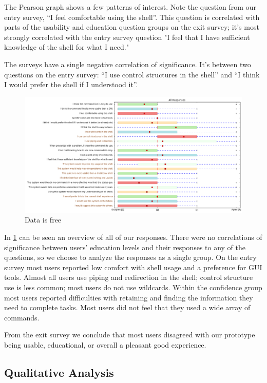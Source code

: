 The Pearson graph shows a few patterns of interest. Note the question from our
entry survey, ``I feel comfortable using the shell''. This question is
correlated with parts of the usability and education question groups on the exit
survey; it's most strongly correlated with the entry survey question "I feel
that I have sufficient knowledge of the shell for what I need."

The surveys have a single negative correlation of significance. It's between two
questions on the entry survey: ``I use control structures in the shell'' and ``I
think I would prefer the shell if I understood it''.

\begin{figure}[H]
  \centering
  \includegraphics[width=\textwidth]{figures/stats/all.png}
  \caption{Data is free}
  \label{fig:alldata}
\end{figure}

In \ref{fig:alldata} can be seen an overview of all of our responses. There were
no correlations of significance between users' education levels and their
responses to any of the questions, so we choose to analyze the responses as a
single group. On the entry survey most users reported low comfort with shell
usage and a preference for GUI tools. Almost all users use piping and
redirection in the shell; control structure use is less common; most users do
not use wildcards. Within the confidence group most users reported difficulties
with retaining and finding the information they need to complete tasks. Most
users did not feel that they used a wide array of commands.

From the exit survey we conclude that most users disagreed with our prototype
being usable, educational, or overall a pleasant good experience.

\subsection{Qualitative Analysis}

